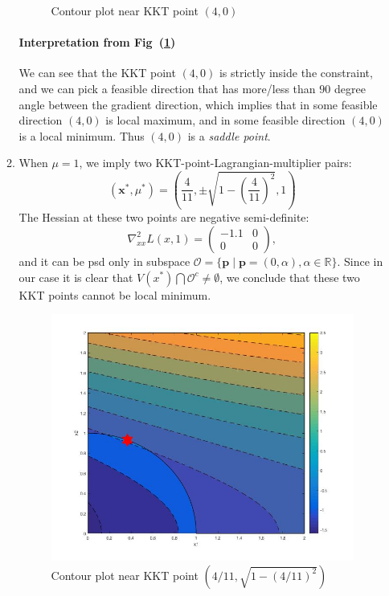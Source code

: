 \begin{enumerate}
\begin{enumerate}
\begin{figure}[H]
\caption{Contour plot near KKT point $(4,0)$}
\label{Fig:1}
\end{figure}
\paragraph{Interpretation from Fig~(\ref{Fig:1})}We can see that the KKT point $(4,0)$ is strictly inside the constraint, and we can pick a feasible direction that has more/less than $90$ degree angle between the gradient direction, which implies that in some feasible direction $(4,0)$ is local maximum, and in some feasible direction $(4,0)$ is a local minimum. Thus $(4,0)$ is a \emph{saddle point}.
\item
When $\mu=1$, we imply two KKT-point-Lagrangian-multiplier pairs:
\[
(\bm x^*,\mu^*)=\left(\frac{4}{11},\pm\sqrt{1-(\frac{4}{11})^2},1\right)
\]
The Hessian at these two points are negative semi-definite:
\[
\nabla^2_{xx}L(x,1)=\begin{pmatrix}
-1.1&0\\0&0
\end{pmatrix},
\]
and it can be psd only in subspace $\mathcal{O}=\{\bm p\mid\bm p=(0,\alpha),\alpha\in\mathbb{R}\}$. Since in our case it is clear that $V(x^*)\bigcap\mathcal{O}^c\ne\emptyset$, we conclude that these two KKT points cannot be local minimum.
\begin{figure}[H]
\includegraphics[width=1\textwidth]{A_7_2}
\centering
\caption{Contour plot near KKT point $(4/11,\sqrt{1-(4/11)^2})$}
\label{Fig:2}
\end{figure}

\end{enumerate}
\end{enumerate}
